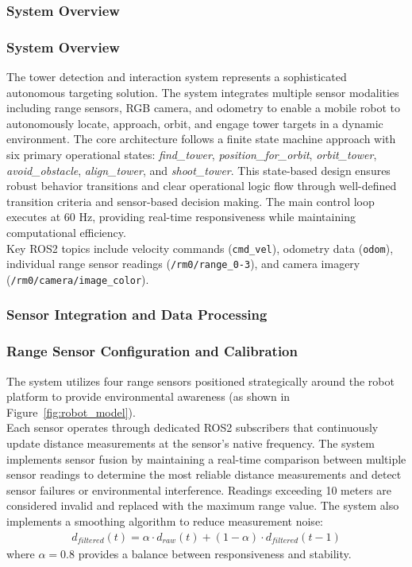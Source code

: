 \subsubsection{System Overview}
\subsubsection{System Overview}
The tower detection and interaction system represents a sophisticated autonomous targeting solution. The system integrates multiple sensor modalities including range sensors, RGB camera, and odometry to enable a mobile robot to autonomously locate, approach, orbit, and engage tower targets in a dynamic environment.
The core architecture follows a finite state machine approach with six primary operational states: \textit{find\_tower}, \textit{position\_for\_orbit}, \textit{orbit\_tower}, \textit{avoid\_obstacle}, \textit{align\_tower}, and \textit{shoot\_tower}. This state-based design ensures robust behavior transitions and clear operational logic flow through well-defined transition criteria and sensor-based decision making.
The main control loop executes at 60 Hz, providing real-time responsiveness while maintaining computational efficiency. \\
Key ROS2 topics include velocity commands (\texttt{cmd\_vel}), odometry data (\texttt{odom}), individual range sensor readings (\texttt{/rm0/range\_{0-3}}), and camera imagery (\texttt{/rm0/camera/image\_color}).
\subsubsection{Sensor Integration and Data Processing}
\subsubsection*{Range Sensor Configuration and Calibration}
The system utilizes four range sensors positioned strategically around the robot platform to provide environmental awareness (as shown in Figure~\ref{fig:robot_model}).\\
Each sensor operates through dedicated ROS2 subscribers that continuously update distance measurements at the sensor's native frequency. The system implements sensor fusion by maintaining a real-time comparison between multiple sensor readings to determine the most reliable distance measurements and detect sensor failures or environmental interference.
Readings exceeding 10 meters are considered invalid and replaced with the maximum range value. The system also implements a smoothing algorithm to reduce measurement noise:
\begin{align}
d_{filtered}(t) = \alpha \cdot d_{raw}(t) + (1-\alpha) \cdot d_{filtered}(t-1)
\end{align}
where $\alpha = 0.8$ provides a balance between responsiveness and stability.
